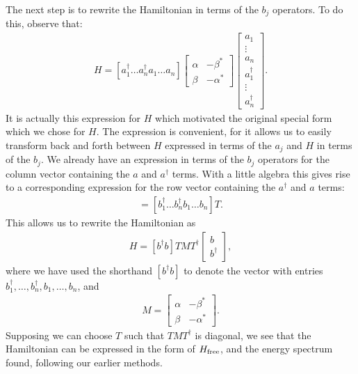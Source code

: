 \documentclass[12pt]{article}
\begin{document}
The next step is to rewrite the Hamiltonian in terms of the $b_j$
operators.  To do this, observe that:
\begin{eqnarray}
  H = [ a_1^\dagger \ldots a_n^\dagger a_1 \ldots a_n ]
  \left[ \begin{array}{cc} \alpha & -\beta^* \\ \beta & -\alpha^*
      \end{array} \right]
    \left[ \begin{array}{c} a_1 \\ \vdots \\ a_n \\ a_1^\dagger \\
        \vdots \\ a_n^\dagger \end{array} \right].
\end{eqnarray}
It is actually this expression for $H$ which motivated the original
special form which we chose for $H$.  The expression is convenient,
for it allows us to easily transform back and forth between $H$
expressed in terms of the $a_j$ and $H$ in terms of the $b_j$.  We
already have an expression in terms of the $b_j$ operators for the
column vector containing the $a$ and $a^\dagger$ terms.  With a little
algebra this gives rise to a corresponding expression for the row
vector containing the $a^\dagger$ and $a$ terms:
\begin{eqnarray}
  [a_1^\dagger \ldots a_n^\dagger a_1 \ldots a_n]
  = [b_1^\dagger \ldots b_n^\dagger b_1 \ldots b_n] T.
\end{eqnarray}
This allows us to rewrite the Hamiltonian as
\begin{eqnarray}
  H = 
  [b^\dagger b]
  T M T^\dagger
  \left[ \begin{array}{c} b \\
    b^\dagger \end{array} \right],
\end{eqnarray}
where we have used the shorthand $[b^\dagger b]$ to denote the vector
with entries $b_1^\dagger, \ldots, b_n^\dagger,b_1,\ldots,b_n$, and
\begin{eqnarray}
  M = \left[ \begin{array}{cc} \alpha & -\beta^* \\ \beta & -\alpha^*
      \end{array} \right].
\end{eqnarray}
Supposing we can choose $T$ such that $TMT^\dagger$ is diagonal, we
see that the Hamiltonian can be expressed in the form of $H_{\rm
  free}$, and the energy spectrum found, following our earlier methods.
\end{document}
